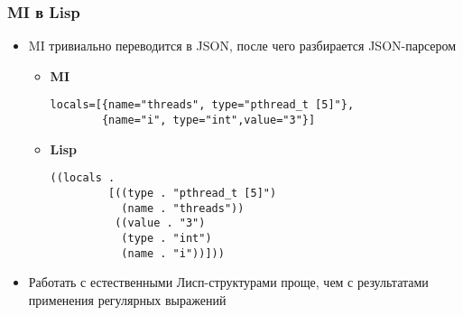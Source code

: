 \documentclass[onlymath]{beamer}
\begin{document}
\begin{frame}[fragile]
  \frametitle{MI в Lisp}
  \begin{itemize}
  \item MI тривиально переводится в JSON, после чего разбирается
    JSON-парсером
    \begin{itemize}
    \item \textbf{MI}
\begin{lstlisting}
locals=[{name="threads", type="pthread_t [5]"},
        {name="i", type="int",value="3"}]
\end{lstlisting}
    \item \textbf{Lisp}
\begin{lstlisting}
((locals .
         [((type . "pthread_t [5]")
           (name . "threads"))
          ((value . "3")
           (type . "int")
           (name . "i"))]))
\end{lstlisting}
    \end{itemize}

  \item Работать с естественными Лисп-структурами проще, чем с
    результатами применения регулярных выражений
  \end{itemize}
\end{frame}
\end{document}
